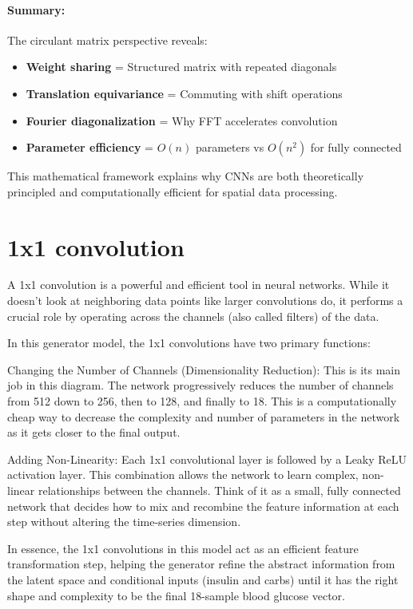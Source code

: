 \documentclass{article}
\begin{document}
\paragraph{Summary:}

The circulant matrix perspective reveals:
\begin{itemize}
    \item \textbf{Weight sharing} = Structured matrix with repeated diagonals
    \item \textbf{Translation equivariance} = Commuting with shift operations
    \item \textbf{Fourier diagonalization} = Why FFT accelerates convolution
    \item \textbf{Parameter efficiency} = $O(n)$ parameters vs $O(n^2)$ for fully connected
\end{itemize}

This mathematical framework explains why CNNs are both theoretically principled and computationally efficient for spatial data processing.


\section{ 1x1 convolution}

A 1x1 convolution is a powerful and efficient tool in neural networks. While it doesn't look at neighboring data points like larger convolutions do, it performs a crucial role by operating across the channels (also called filters) of the data.

In this generator model, the 1x1 convolutions have two primary functions:

Changing the Number of Channels (Dimensionality Reduction): This is its main job in this diagram. The network progressively reduces the number of channels from 512 down to 256, then to 128, and finally to 18.  This is a computationally cheap way to decrease the complexity and number of parameters in the network as it gets closer to the final output.


Adding Non-Linearity: Each 1x1 convolutional layer is followed by a Leaky ReLU activation layer.  This combination allows the network to learn complex, non-linear relationships between the channels. Think of it as a small, fully connected network that decides how to mix and recombine the feature information at each step without altering the time-series dimension.


In essence, the 1x1 convolutions in this model act as an efficient feature transformation step, helping the generator refine the abstract information from the latent space and conditional inputs (insulin and carbs) until it has the right shape and complexity to be the final 18-sample blood glucose vector.
\end{document}
